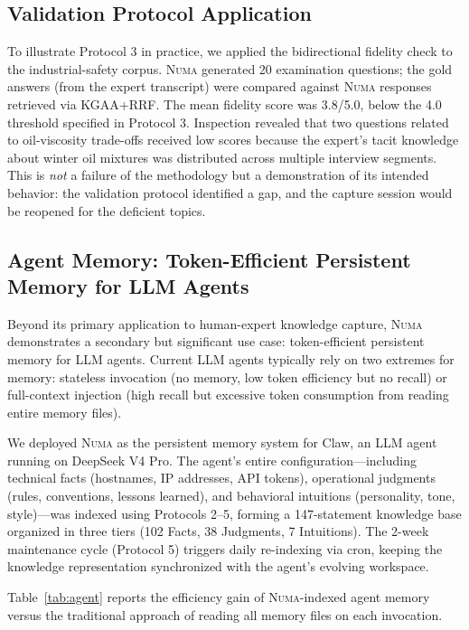 \documentclass[11pt,a4paper]{article}
\begin{document}
\subsection{Validation Protocol Application}

To illustrate Protocol 3 in practice, we applied the bidirectional fidelity check to the industrial-safety corpus. \textsc{Numa} generated 20 examination questions; the gold answers (from the expert transcript) were compared against \textsc{Numa} responses retrieved via KGAA+RRF. The mean fidelity score was 3.8/5.0, below the 4.0 threshold specified in Protocol 3. Inspection revealed that two questions related to oil-viscosity trade-offs received low scores because the expert's tacit knowledge about winter oil mixtures was distributed across multiple interview segments. This is \emph{not} a failure of the methodology but a demonstration of its intended behavior: the validation protocol identified a gap, and the capture session would be reopened for the deficient topics.

\subsection{Agent Memory: Token-Efficient Persistent Memory for LLM Agents}

Beyond its primary application to human-expert knowledge capture, \textsc{Numa} demonstrates a secondary but significant use case: token-efficient persistent memory for LLM agents. Current LLM agents typically rely on two extremes for memory: stateless invocation (no memory, low token efficiency but no recall) or full-context injection (high recall but excessive token consumption from reading entire memory files).

We deployed \textsc{Numa} as the persistent memory system for Claw, an LLM agent running on DeepSeek V4 Pro. The agent's entire configuration---including technical facts (hostnames, IP addresses, API tokens), operational judgments (rules, conventions, lessons learned), and behavioral intuitions (personality, tone, style)---was indexed using Protocols 2--5, forming a 147-statement knowledge base organized in three tiers (102 Facts, 38 Judgments, 7 Intuitions). The 2-week maintenance cycle (Protocol 5) triggers daily re-indexing via cron, keeping the knowledge representation synchronized with the agent's evolving workspace.

Table~\ref{tab:agent} reports the efficiency gain of \textsc{Numa}-indexed agent memory versus the traditional approach of reading all memory files on each invocation.
\end{document}

